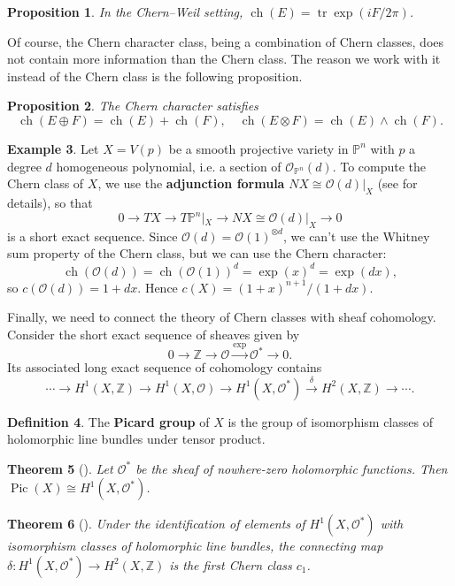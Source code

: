 \documentclass{report}
\theoremstyle{plain}
\newtheorem{theorem}{Theorem}[section]
\newtheorem{proposition}[theorem]{Proposition}
\theoremstyle{definition}
\newtheorem{definition}[theorem]{Definition}
\newtheorem{example}[theorem]{Example}
\theoremstyle{remark}
\newcommand{\bP}{\mathbb{P}}
\newcommand{\bZ}{\mathbb{Z}}
\newcommand{\cO}{\mathcal{O}}
\DeclareMathOperator{\Pic}{Pic}
\DeclareMathOperator{\tr}{tr}
\DeclareMathOperator{\ch}{ch}
\begin{document}
\begin{proposition}
  In the Chern--Weil setting, $\ch(E) = \tr \exp(iF/2\pi)$.
\end{proposition}

Of course, the Chern character class, being a combination of Chern
classes, does not contain more information than the Chern class. The
reason we work with it instead of the Chern class is the following
proposition.

\begin{proposition}
  The Chern character satisfies
  \[ \ch(E \oplus F) = \ch(E) + \ch(F), \quad \ch(E \otimes F) = \ch(E) \wedge \ch(F). \]
\end{proposition}

\begin{example} \label{ex:chern-hypersurface}
  Let $X = V(p)$ be a smooth projective variety in $\bP^n$ with $p$ a
  degree $d$ homogeneous polynomial, i.e. a section of
  $\cO_{\bP^n}(d)$. To compute the Chern class of $X$, we use the {\bf
    adjunction formula} $NX \cong \cO(d)|_X$ (see \cite[Proposition
    2.2.17]{Huybrechts2005} for details), so that
  \[ 0 \to TX \to T\bP^n|_X \to NX \cong \cO(d)|_X \to 0 \]
  is a short exact sequence. Since $\cO(d) = \cO(1)^{\otimes d}$, we
  can't use the Whitney sum property of the Chern class, but we can
  use the Chern character:
  \[ \ch(\cO(d)) = \ch(\cO(1))^d = \exp(x)^d = \exp(dx), \]
  so $c(\cO(d)) = 1 + dx$. Hence $c(X) = (1 + x)^{n+1}/(1 + dx)$.
\end{example}

Finally, we need to connect the theory of Chern classes with sheaf
cohomology. Consider the short exact sequence of sheaves given by
\[ 0 \to \bZ \to \cO \xrightarrow{\exp} \cO^* \to 0. \]
Its associated long exact sequence of cohomology contains
\[ \cdots \to H^1(X, \bZ) \to H^1(X, \cO) \to H^1(X, \cO^*) \xrightarrow{\delta} H^2(X, \bZ) \to \cdots. \]

\begin{definition}
  The {\bf Picard group} of $X$ is the group of isomorphism classes of
  holomorphic line bundles under tensor product.
\end{definition}

\begin{theorem}[{\cite[Corollary 2.2.10]{Huybrechts2005}}]
  Let $\cO^*$ be the sheaf of nowhere-zero holomorphic functions. Then
  $\Pic(X) \cong H^1(X, \cO^*)$.
\end{theorem}

\begin{theorem}[{\cite[Proposition 4.4.12]{Huybrechts2005}}]
  Under the identification of elements of $H^1(X, \cO^*)$ with
  isomorphism classes of holomorphic line bundles, the connecting map
  $\delta\colon H^1(X, \cO^*) \to H^2(X, \bZ)$ is the first Chern
  class $c_1$.
\end{theorem}
\end{document}
